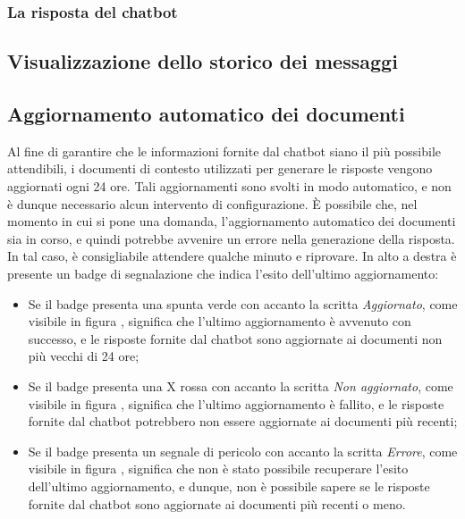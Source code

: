 \subsubsection{La risposta del chatbot}


\subsection{Visualizzazione dello storico dei messaggi}


\subsection{Aggiornamento automatico dei documenti}
\label{subsec:aggiornamento_automatico_documenti}
Al fine di garantire che le informazioni fornite dal chatbot siano il più possibile attendibili, i documenti di contesto utilizzati per generare le risposte vengono aggiornati ogni 24 ore.
Tali aggiornamenti sono svolti in modo automatico, e non è dunque necessario alcun intervento di configurazione.
È possibile che, nel momento in cui si pone una domanda, l'aggiornamento automatico dei documenti sia in corso, e quindi potrebbe avvenire un errore nella generazione della risposta. In tal caso, è consigliabile attendere qualche minuto e riprovare.
In alto a destra è presente un badge di segnalazione che indica l'esito dell'ultimo aggiornamento:
\begin{itemize}
    \item Se il badge presenta una spunta verde con accanto la scritta \emph{Aggiornato}, come visibile in figura , significa che l'ultimo aggiornamento è avvenuto con successo, e le risposte fornite
    dal chatbot sono aggiornate ai documenti non più vecchi di 24 ore;
    \item Se il badge presenta una X rossa con accanto la scritta \emph{Non aggiornato}, come visibile in figura , significa che l'ultimo aggiornamento è fallito, e le risposte fornite dal chatbot potrebbero
    non essere aggiornate ai documenti più recenti;
    \item Se il badge presenta un segnale di pericolo con accanto la scritta \emph{Errore}, come visibile in figura , significa che non è stato possibile recuperare l'esito dell'ultimo aggiornamento, e
    dunque, non è possibile sapere se le risposte fornite dal chatbot sono aggiornate ai documenti più recenti o meno.
\end{itemize}

